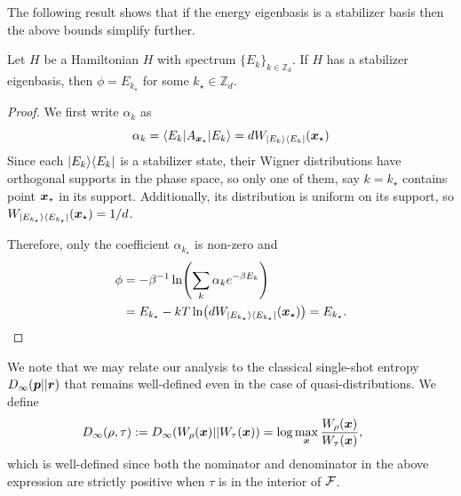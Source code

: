 \documentclass[pra,
aps,
twocolumn,
superscriptaddress,
groupedaddress,
nofootinbib,
reprint
]{revtex4-1}
\begin{document}
The following result shows that if the energy eigenbasis is a stabilizer basis then the above bounds simplify further.
\begin{proposition} \label{sharp-phi}
	Let $H$ be a Hamiltonian $H$ with spectrum $\{E_k\}_{k \in \mathbb{Z}_d}$.
	If $H$ has a stabilizer eigenbasis, then $\phi = E_{k_{\star}}$ for some $k_{\star} \in \mathbb{Z}_d$.
\end{proposition}
\begin{proof}
	We first write $\alpha_k$ as
\begin{equation}
	\alpha_k = \langle E_k | A_{\bm{x}_{\star}} |E_k\rangle = d W_{|E_k\rangle\langle E_k|}(\bm{x}_{\star})
\end{equation}
Since each $|E_k\rangle\langle E_k|$ is a stabilizer state, their Wigner distributions have orthogonal supports in the phase space, so only one of them, say $k = k_{\star}$ contains point $\bm{x}_{\star}$ in its support. 
Additionally, its distribution is uniform on its support, so $W_{|E_{k_\star}\rangle\langle E_{k_\star}|}(\bm{x}_{\star}) = 1/d$.

Therefore, only the coefficient $\alpha_{k_{\star}}$ is non-zero and
\begin{align}
\phi &= -\beta^{-1}\ln (\sum_k \alpha_k e^{-\beta E_k}) \nonumber \\
&=E_{k_{\star}} -kT \ln (d W_{|E_{k_\star}\rangle\langle E_{k_\star}|}(\bm{x}_{\star})) =E_{k_{\star}}.
\end{align}

\end{proof}

We note that we may relate our analysis to the classical single-shot entropy $D_\infty (\boldsymbol{p} ||\boldsymbol{r})$ that remains well-defined even in the case of quasi-distributions. We define 
\begin{equation}
	\hspace{-14pt}D_\infty(\rho,\tau) := D_\infty(W_\rho(\x) || W_\tau (\x)) = \log  \max_{\x} \frac{W_\rho(\x)}{W_\tau(\x)},
\end{equation}
which is well-defined since both the nominator and denominator in the above expression are strictly positive when $\tau$ is in the interior of ${\mathcal F}$.
\end{document}
